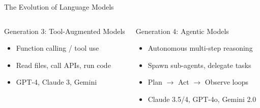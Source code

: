 \documentclass[aspectratio=169,xcolor=dvipsnames]{beamer}
\begin{document}
\begin{frame}{The Evolution of Language Models}
\begin{columns}
        \begin{block}{Generation 3: Tool-Augmented Models}
            \begin{itemize}
                \item Function calling / tool use
                \item Read files, call APIs, run code
                \item GPT-4, Claude 3, Gemini
            \end{itemize}
        \end{block}
        \begin{alertblock}{Generation 4: Agentic Models}
            \begin{itemize}
                \item Autonomous multi-step reasoning
                \item Spawn sub-agents, delegate tasks
                \item Plan $\rightarrow$ Act $\rightarrow$ Observe loops
                \item Claude 3.5/4, GPT-4o, Gemini 2.0
            \end{itemize}
        \end{alertblock}
    \end{columns}
\end{frame}
\end{document}

